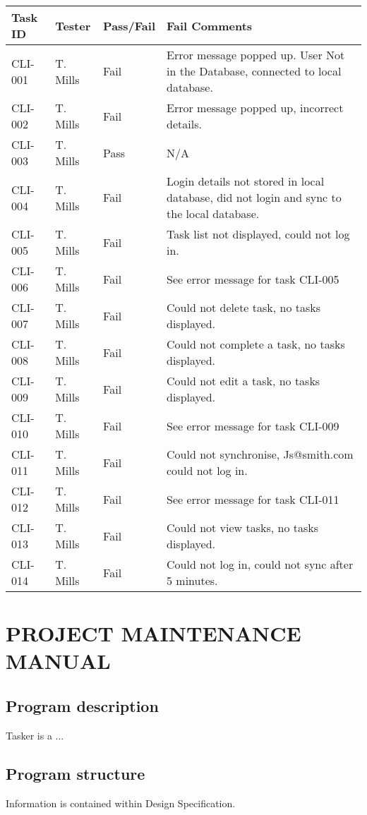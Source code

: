 \documentclass{project}
\begin{document}
\begin{longtable}{| p{1.8cm} | p{2.5cm} | p{2.5cm} | p{8.5cm} |}
\hline
Task ID & Tester & Pass/Fail &  Fail Comments \\
\hline
CLI-001 & T. Mills & Fail & Error message popped up. User Not in the Database, connected to local database.  \\
\hline
CLI-002 & T. Mills & Fail & Error message popped up, incorrect details.  \\
\hline
CLI-003 & T. Mills & Pass & N/A \\
\hline
CLI-004 & T. Mills & Fail & Login details not stored in local database, did not login and sync to the local database.  \\
\hline
CLI-005 & T. Mills & Fail & Task list not displayed, could not log in. \\
\hline
CLI-006 & T. Mills & Fail & See error message for task CLI-005  \\
\hline
CLI-007 & T. Mills & Fail & Could not delete task, no tasks displayed.  \\
\hline
CLI-008 & T. Mills & Fail & Could not complete a task, no tasks displayed.  \\
\hline
CLI-009 & T. Mills & Fail & Could not edit a task, no tasks displayed.  \\
\hline
CLI-010 & T. Mills & Fail & See error message for task CLI-009  \\
\hline
CLI-011 & T. Mills & Fail & Could not synchronise, Js@smith.com could not log in.  \\
\hline
CLI-012 & T. Mills & Fail & See error message for task CLI-011  \\
\hline
CLI-013 & T. Mills & Fail & Could not view tasks, no tasks displayed.  \\
\hline
CLI-014 & T. Mills & Fail & Could not log in, could not sync after 5 minutes. \\
\hline
\end{longtable}
\clearpage

\section{PROJECT MAINTENANCE MANUAL}
\subsection{Program description}
Tasker is a ...

\subsection{Program structure}
Information is contained within Design Specification\cite{se.qa.ds}.
\end{document}
